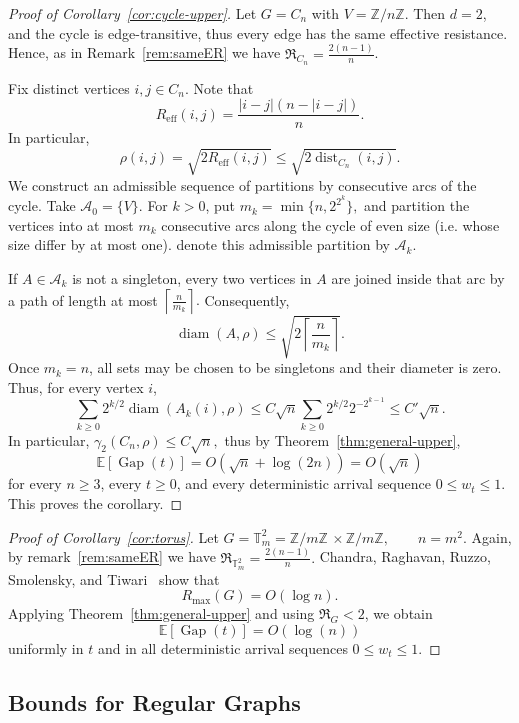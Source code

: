 \documentclass[11pt]{article}
\numberwithin{equation}{section}
\newcommand{\E}{\mathbb{E}}
\newcommand{\1}{\mathbf{1}}
\newcommand{\Gap}{\operatorname{Gap}}
\begin{document}
\begin{proof}[Proof of Corollary~\ref{cor:cycle-upper}]
Let \(G=C_n\) with $V=\mathbb Z / n\mathbb Z$. Then \(d=2\), and the cycle is edge-transitive, thus every edge has the same effective resistance. Hence, as in Remark~\ref{rem:sameER} we have
\( \Re_{C_n} = \frac{2(n-1)}{n}\).

Fix distinct vertices \(i,j\in C_n\). Note that
\[
R_{\mathrm{eff}}(i,j)
=
\frac{|i-j|(n-|i-j|)}{n}.
\] 
In particular,
\[
\rho(i,j)  =
\sqrt{2R_{\mathrm{eff}}(i,j)}
\le
\sqrt{2\operatorname{dist}_{C_n}(i,j)}.
\]
We construct an admissible sequence of partitions by consecutive arcs of the cycle. Take \(\mathcal A_0 = \{V\}\). For \(k>0\), put \(m_k=\min\{n,2^{2^k}\},\) and partition the vertices into at most \(m_k\) consecutive arcs along the cycle of  even size (i.e. whose size differ by at most one). denote this admissible partition by \(\mathcal A_k\). 

If \(A\in\mathcal A_k\) is not a singleton, every two vertices in \(A\) are joined inside that arc by a path of length at most
\( \left\lceil\frac{n}{m_k}\right\rceil. \) Consequently,
\[
\operatorname{diam}(A,\rho)
\le
\sqrt{
2\left\lceil\frac{n}{m_k}\right\rceil
}.
\]
Once \(m_k=n\), all sets may be chosen to be singletons and their diameter is zero. Thus, for every vertex \(i\),
\[
\sum_{k\ge0}
2^{k/2}
\operatorname{diam}(A_k(i),\rho)
\le
C\sqrt n
\sum_{k\ge0}
2^{k/2}2^{-2^{k-1}}
\le
C'\sqrt n.
\]
In particular,
\(\gamma_2(C_n,\rho) \le C\sqrt n,\) thus by Theorem~\ref{thm:general-upper},
\[
\E[\Gap(t)]
=
O\left(
\sqrt n+\log(2n)
\right)
=
O(\sqrt n)
\]
for every \(n\ge3\), every \(t\ge0\), and every deterministic arrival sequence \(0\le w_t\le1\). This proves the corollary.
\end{proof}

\begin{proof}[Proof of Corollary~\ref{cor:torus}]
Let
\(G=\mathbb T_m^2=\mathbb Z/m\mathbb Z \, \times \mathbb Z/m\mathbb Z,
\qquad
n=m^2.\)
Again, by remark~\ref{rem:sameER} we have \( \Re_{\mathbb T_m^2}=\frac{2(n-1)}{n}.\)
Chandra, Raghavan, Ruzzo, Smolensky, and Tiwari~\cite[Theorem~6.1]{ChandraResistance} show that
\[
R_{\max}(G)
=
O(\log n).
\]
Applying Theorem~\ref{thm:general-upper} and using \(\Re_G<2\), we obtain
\[
\E[\Gap(t)]
=
O(\log(n))
\]
uniformly in \(t\) and in all deterministic arrival sequences \(0\le w_t\le1\). 
\end{proof}

\subsection{Bounds for Regular Graphs}\label{sec:BoundsRegGraphs}
\end{document}
